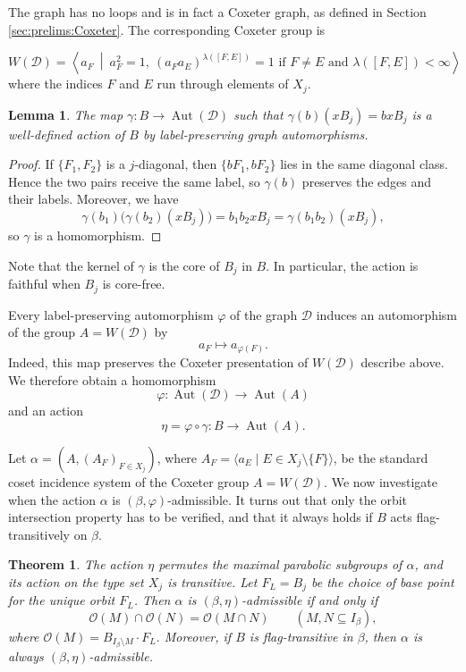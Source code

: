 \documentclass[11pt,letterpaper]{amsart}
\newtheorem{thm}[prop]{Theorem}
\newtheorem{lemma}[prop]{Lemma}
\DeclareMathOperator{\Aut}{Aut}
\begin{document}
The graph has no loops and is in fact a Coxeter graph, as defined in Section \ref{sec:prelims:Coxeter}. The corresponding Coxeter group is

\begin{equation*}
W(\mathcal{D})=\left\langle a_F\ \middle|\
 a_F^2=1,\ (a_Fa_E)^{\lambda([F,E])}=1
 \text{ if }F\neq E\text{ and }\lambda([F,E])<\infty
\right\rangle
\end{equation*}
where the indices $F$ and $E$ run through elements of $X_j$.
\begin{lemma}\label{lem:gammaHomoGraph}
The map $\gamma:B\longrightarrow\Aut(\mathcal{D})$ such that $\gamma(b)(xB_j)=bxB_j$
is a well-defined action of $B$ by label-preserving graph automorphisms.
\end{lemma}

\begin{proof}
If $\{F_1,F_2\}$ is a $j$-diagonal, then $\{bF_1,bF_2\}$ lies in the same diagonal class. Hence the two pairs receive the same label, so $\gamma(b)$ preserves the edges and their labels. Moreover, we have
$$
\gamma(b_1)\bigl(\gamma(b_2)(xB_j)\bigr)
=b_1b_2xB_j
=\gamma(b_1b_2)(xB_j),
$$
so $\gamma$ is a homomorphism.
\end{proof}

Note that the kernel of $\gamma$ is the core of $B_j$ in $B$. In particular, the action is faithful when $B_j$ is core-free.

Every label-preserving automorphism $\varphi$ of the graph $\mathcal{D}$ induces an automorphism of the group $A=W(\mathcal{D})$ by
$$
a_F\longmapsto a_{\varphi(F)}.
$$
Indeed, this map preserves the Coxeter presentation of $W(\mathcal{D})$ describe above. We therefore obtain a homomorphism
$$
\varphi:\Aut(\mathcal{D})\longrightarrow\Aut(A)
$$
and an action
\begin{equation}\label{eq:eta}
\eta=\varphi\circ\gamma:B\longrightarrow\Aut(A).
\end{equation}

Let
$\alpha=(A,(A_F)_{F\in X_j})$, where $A_F=\langle a_E\mid E\in X_j\setminus\{F\}\rangle$,
be the standard coset incidence system of the Coxeter group $A = W(\mathcal{D})$. We now investigate when the action $\alpha$ is $(\beta,\varphi)$-admissible. It turns out that only the orbit intersection property has to be verified, and that it always holds if $B$ acts flag-transitively on $\beta$.

\begin{thm}\label{thm:admissibility-diagonal}
The action $\eta$ permutes the maximal parabolic subgroups of $\alpha$, and its action on the type set $X_j$ is transitive. Let $F_L=B_j$ be the choice of base point for the unique orbit $F_L$. Then $\alpha$ is $(\beta,\eta)$-admissible if and only if
\begin{equation}\label{eq:IPO-diagonal}
\mathcal O(M)\cap\mathcal O(N)=\mathcal O(M\cap N)
\qquad(M,N\subseteq I_\beta),
\end{equation}
where
$\mathcal O(M)=B_{I_\beta\setminus M}\cdot F_L.$
Moreover, if $B$ is flag-transitive in $\beta$, then $\alpha$ is always $(\beta,\eta)$-admissible.
\end{thm}
\end{document}
